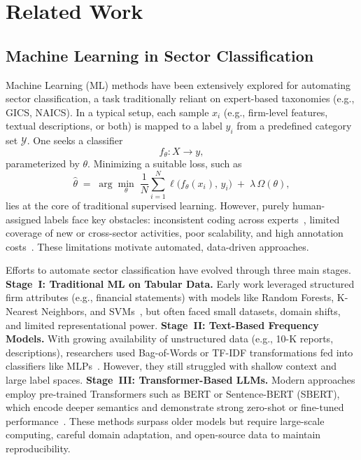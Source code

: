 \section{Related Work}
\subsection{Machine Learning in Sector Classification}
Machine Learning (ML) methods have been extensively explored for automating sector classification, a task traditionally reliant on expert-based taxonomies (e.g., GICS, NAICS). In a typical setup, each sample \(x_i\) (e.g., firm-level features, textual descriptions, or both) is mapped to a label \(y_i\) from a predefined category set \(\mathcal{Y}\). One seeks a classifier
\[
    f_{\theta}: X \to y,
\]
parameterized by \(\theta\). Minimizing a suitable loss, such as
\[
    \hat{\theta} \;=\; \arg\min_{\theta} \; \frac{1}{N}\sum_{i=1}^{N} \ell\bigl(f_{\theta}(x_i),\, y_i\bigr) \;+\; \lambda\,\Omega(\theta),
\]
lies at the core of traditional supervised learning. However, purely human-assigned labels face key obstacles: inconsistent coding across experts~\cite{sylolypavan2023impact}, limited coverage of new or cross-sector activities, poor scalability, and high annotation costs~\cite{sectorclassify9, sectorclassify10}. These limitations motivate automated, data-driven approaches.

Efforts to automate sector classification have evolved through three main stages. \textbf{Stage~I: Traditional ML on Tabular Data.} Early work leveraged structured firm attributes (e.g., financial statements) with models like Random Forests, K-Nearest Neighbors, and SVMs~\cite{sectorclassify4, sectorclassify5, sectorclassify6, sectorclassify9, sectorclassify12, sectorclassify1}, but often faced small datasets, domain shifts, and limited representational power. \textbf{Stage~II: Text-Based Frequency Models.} With growing availability of unstructured data (e.g., 10-K reports, descriptions), researchers used Bag-of-Words or TF-IDF transformations fed into classifiers like MLPs~\cite{sectorclassify4, sectorclassify5, sectorclassify8, sectorclassify7, sectorclassify11}. However, they still struggled with shallow context and large label spaces. \textbf{Stage~III: Transformer-Based LLMs.} Modern approaches employ pre-trained Transformers such as BERT or Sentence-BERT (SBERT), which encode deeper semantics and demonstrate strong zero-shot or fine-tuned performance~\cite{jain2024empowering, balaji2023flamingo, balaji2023caml, sectorclassify3}. These methods surpass older models but require large-scale computing, careful domain adaptation, and open-source data to maintain reproducibility.

